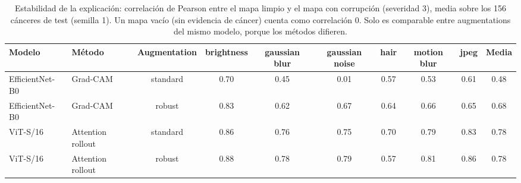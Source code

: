 \begin{table}[t]
\caption{Estabilidad de la explicación: correlación de Pearson entre el mapa limpio y el mapa con corrupción (severidad 3), media sobre los 156 cánceres de test (semilla 1). Un mapa vacío (sin evidencia de cáncer) cuenta como correlación 0. Solo es comparable entre augmentations del mismo modelo, porque los métodos difieren.}
\label{tab:explain_stability}
\centering
\begin{adjustbox}{max width=\linewidth}
\begin{tabular}{llcccccccc}
\toprule
Modelo & Método & Augmentation & brightness & gaussian blur & gaussian noise & hair & motion blur & jpeg & Media \\
\midrule
EfficientNet-B0 & Grad-CAM & standard & 0.70 & 0.45 & 0.01 & 0.57 & 0.53 & 0.61 & 0.48 \\
EfficientNet-B0 & Grad-CAM & robust & 0.83 & 0.62 & 0.67 & 0.64 & 0.66 & 0.65 & 0.68 \\
ViT-S/16 & Attention rollout & standard & 0.86 & 0.76 & 0.75 & 0.70 & 0.79 & 0.83 & 0.78 \\
ViT-S/16 & Attention rollout & robust & 0.88 & 0.78 & 0.79 & 0.57 & 0.81 & 0.86 & 0.78 \\
\bottomrule
\end{tabular}
\end{adjustbox}
\end{table}
